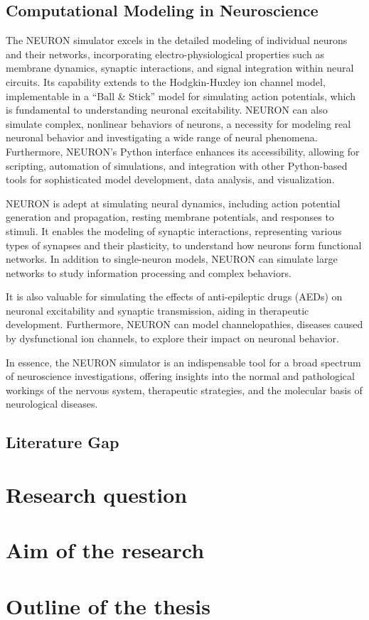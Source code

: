 \subsection{Computational Modeling in Neuroscience}
The NEURON simulator excels in the detailed modeling of individual neurons and their networks, incorporating electro-physiological properties such as membrane dynamics, synaptic interactions, and signal integration within neural circuits. 
Its capability extends to the Hodgkin-Huxley ion channel model, implementable in a ``Ball \& Stick'' model for simulating action potentials, which is fundamental to understanding neuronal excitability.
NEURON can also simulate complex, nonlinear behaviors of neurons, a necessity for modeling real neuronal behavior and investigating a wide range of neural phenomena. 
Furthermore, NEURON's Python interface enhances its accessibility, allowing for scripting, automation of simulations, and integration with other Python-based tools for sophisticated model development, data analysis, and visualization.

NEURON is adept at simulating neural dynamics, including action potential generation and propagation, resting membrane potentials, and responses to stimuli. 
It enables the modeling of synaptic interactions, representing various types of synapses and their plasticity, to understand how neurons form functional networks. 
In addition to single-neuron models, NEURON can simulate large networks to study information processing and complex behaviors. 

It is also valuable for simulating the effects of anti-epileptic drugs (AEDs) on neuronal excitability and synaptic transmission, aiding in therapeutic development. 
Furthermore, NEURON can model channelopathies, diseases caused by dysfunctional ion channels, to explore their impact on neuronal behavior. 

In essence, the NEURON simulator is an indispensable tool for a broad spectrum of neuroscience investigations, offering insights into the normal and pathological workings of the nervous system, therapeutic strategies, and the molecular basis of neurological diseases.

\subsection{Literature Gap}

\section{Research question}

\section{Aim of the research}

\section{Outline of the thesis}